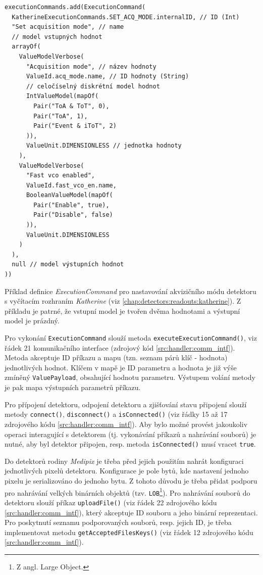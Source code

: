 \begin{code}[h!]
\begin{verbatim}
executionCommands.add(ExecutionCommand(
  KatherineExecutionCommands.SET_ACQ_MODE.internalID, // ID (Int)
  "Set acquisition mode", // name
  // model vstupných hodnot
  arrayOf(
    ValueModelVerbose(
      "Acquisition mode", // název hodnoty
      ValueId.acq_mode.name, // ID hodnoty (String)
	  // celočíselný diskrétní model hodnot
	  IntValueModel(mapOf(
        Pair("ToA & ToT", 0),
        Pair("ToA", 1),
        Pair("Event & iToT", 2)
      )),
      ValueUnit.DIMENSIONLESS // jednotka hodnoty
    ), 
    ValueModelVerbose(
      "Fast vco enabled",
      ValueId.fast_vco_en.name,
      BooleanValueModel(mapOf(
        Pair("Enable", true),
        Pair("Disable", false)
      )),
      ValueUnit.DIMENSIONLESS
	)
  ),
  null // model výstupních hodnot
))
\end{verbatim}
\caption{Příklad definice \textit{ExecutionCommand} pro nastavování akvizičního módu detektoru s vyčítacím rozhraním \textit{Katherine} (viz \ref{chap:detectors:readouts:katherine}). Z příkladu je patrné, že vstupní model je tvořen dvěma hodnotami a výstupní model je prázdný.}
\label{src:handler:execution_command}
\end{code}

Pro vykonání \texttt{ExecutionCommand} slouží metoda \texttt{executeExecutionCommand()}, viz řádek 21 komunikačního interface (zdrojový kód \ref{src:handler:comm_intf}). Metoda akceptuje ID příkazu a mapu (tzn. seznam párů klíč - hodnota) jednotlivých hodnot. Klíčem v mapě je ID parametru a hodnota je již výše zmíněný \texttt{ValuePayload}, obsahující hodnotu parametru. Výstupem volání metody je pak mapa výstupních parametrů příkazu.

Pro přípojení detektoru, odpojení detektoru a zjišťování stavu připojení slouží metody \texttt{connect()}, \texttt{disconnect()} a \texttt{isConnected()} (viz řádky 15 až 17 zdrojového kódu \ref{src:handler:comm_intf}). Aby bylo možné provést jakoukoliv operaci interagující s detektorem (tj. vykonávání příkazů a nahrávání souborů) je nutné, aby byl detektor připojen, resp. metoda \texttt{isConnected()} musí vracet \texttt{true}.

Do detektorů rodiny \textit{Medipix} je třeba před jejich použitím nahrát konfiguraci jednotlivých pixelů detektoru. Konfigurace je pole bytů, kde nastavení jednoho pixelu je serializováno do jednoho bytu. Z tohoto důvodu je třeba přidat podporu pro nahrávání velkých binárních objektů (tzv. \texttt{LOB}\footnote{Z angl. Large Object.}).
Pro nahrávání souborů do detektoru slouží příkaz \texttt{uploadFile()} (viz řádek 22 zdrojového kódu \ref{src:handler:comm_intf}), který akceptuje ID souboru a jeho binární reprezentaci. Pro poskytnutí seznamu podporovaných souborů, resp. jejich ID, je třeba implementovat metodu \texttt{getAcceptedFilesKeys()} (viz řádek 12 zdrojového kódu \ref{src:handler:comm_intf}).

